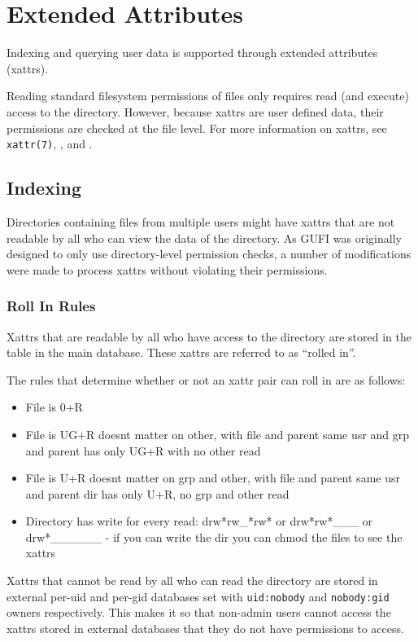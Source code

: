 \section{Extended Attributes}
Indexing and querying user data is supported through extended
attributes (xattrs).

Reading standard filesystem permissions of files only requires read
(and execute) access to the directory. However, because xattrs are
user defined data, their permissions are checked at the file
level. For more information on xattrs, see \texttt{xattr(7)},
\listxattr, and \getxattr.

\subsection{Indexing}
Directories containing files from multiple users might have xattrs
that are not readable by all who can view the \lstat data of the
directory. As GUFI was originally designed to only use directory-level
permission checks, a number of modifications were made to process
xattrs without violating their permissions.

\subsubsection{Roll In Rules}
Xattrs that are readable by all who have access to the directory are
stored in the \xattrspwd table in the main database. These xattrs are
referred to as ``rolled in''.

The rules that determine whether or not an xattr pair can roll in are
as follows:

\begin{itemize}
\item File is 0+R
\item File is UG+R doesnt matter on other, with file and parent same
  usr and grp and parent has only UG+R with no other read
\item File is U+R doesnt matter on grp and other, with file and parent
  same usr and parent dir has only U+R, no grp and other read
\item Directory has write for every read: drw*rw\_*rw* or
  drw*rw*\_\_\_ or drw*\_\_\_\_\_\_ - if you can write the dir you can
  chmod the files to see the xattrs
\end{itemize}

Xattrs that cannot be read by all who can read the directory are
stored in external per-uid and per-gid databases set with
\texttt{uid:nobody} and \texttt{nobody:gid} owners respectively. This
makes it so that non-admin users cannot access the xattrs stored in
external databases that they do not have permissions to access.

